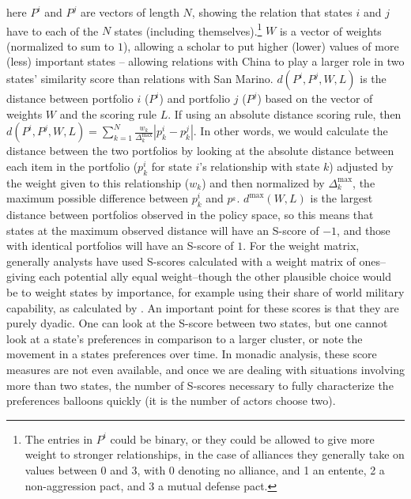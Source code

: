 \noindent here $P^{i}$ and $P^{j}$ are vectors of length $N$, showing the relation that states $i$ and $j$ have to each of the $N$ states (including themselves).\footnote{The entries in $P^{i}$ could be binary, or they could be allowed to give more weight to stronger relationships, in the case of alliances they generally take on values between 0 and 3, with 0 denoting no alliance, and 1 an entente, 2 a non-aggression pact, and 3 a mutual defense pact.} $W$ is a vector of weights (normalized to sum to $1$), allowing a scholar to put higher (lower) values of more (less) important states -- allowing relations with China to play a larger role in two states' similarity score than relations with San Marino. $d(P^i, P^j, W, L)$ is the distance between portfolio $i$ ($P^i$) and portfolio $j$ ($P^j$) based on the vector of weights $W$ and the scoring rule $L$. If using an absolute distance scoring rule, then $d(P^i, P^j, W, L) = \sum_{k = 1}^N \frac{w_k}{\Delta^\text{max}_{k}} |p^i_k - p^j_k|$. In other words, we would calculate the distance between the two portfolios by looking at the absolute distance between each item in the portfolio ($p^i_{k}$ for state $i$'s relationship with state $k$) adjusted by the weight given to this relationship ($w_{k}$) and then normalized by  $\Delta^\text{max}_{k}$, the maximum possible difference between $p^{i}_{k}$ and $p^_{k}$. $d^{\text{max}}(W,L)$ is the largest distance between portfolios observed in the policy space, so this means that states at the maximum observed distance will have an S-score of $-1$, and those with identical portfolios will have an S-score of $1$. For the weight matrix, generally analysts have used S-scores calculated with a weight matrix of ones--giving each potential ally equal weight--though the other plausible choice would be to weight states by importance, for example using their share of world military capability, as calculated by \citet{singer:small:1995}. An important point for these scores is that they are purely dyadic. One can look at the S-score between two states, but one cannot look at a state's preferences in comparison to a larger cluster, or note the movement in a states preferences over time. In monadic analysis, these score measures are not even available, and once we are dealing with situations involving more than two states, the number of S-scores necessary to fully characterize the preferences balloons quickly (it is the number of actors choose two). 

